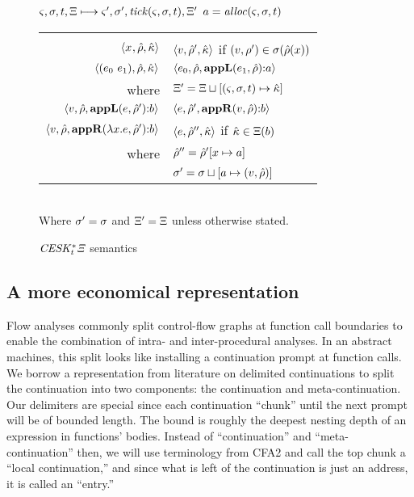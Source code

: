 \begin{figure}
  \centering
  $\varsigma,\sigma,t,\Xi \longmapsto \varsigma',\sigma',\mathit{tick}(\varsigma,\sigma,t),\Xi'$ \quad $a = \mathit{alloc}(\varsigma,\sigma,t)$ \\
  \begin{tabular}{r|l}
    \hline\vspace{-3mm}\\
    $\langle x^{{}}, \hat{\rho}, \hat{\kappa} \rangle$
    &
    $\langle v, \hat{\rho}',\hat{\kappa} \rangle$ if $(v,\rho') \in \sigma(\hat{\rho}(x))$
    \\
    $\langle (e_{0}\ e_{1}){},\hat{\rho},\hat{\kappa} \rangle$
    &
    $\langle e_{0},\hat{\rho},\mathbf{appL}(e_{1},\hat{\rho}){\tt :} a \rangle$ \\
    where & $\Xi' = \Xi\sqcup[(\varsigma,\sigma,t) \mapsto \hat{\kappa}]$
    \\
    $\langle v,\hat{\rho}, \mathbf{appL}(e,\hat{\rho}'){\tt :} b \rangle$
    &
    $\langle e,\hat{\rho}',\mathbf{appR}(v,\hat{\rho}){\tt :} b \rangle$
    \\
    $\langle v,\hat{\rho},\mathbf{appR}(\lambda{} x. e,\hat{\rho}'){\tt :} b \rangle$
    &
    $\langle e,\hat{\rho}'',\hat{\kappa} \rangle$ if $\hat{\kappa} \in \Xi(b)$ \\
    where & $\hat{\rho}'' = \hat{\rho}'[x\mapsto a]$ \\
          & $\sigma' = \sigma\sqcup[a \mapsto (v,\hat{\rho})]$
  \end{tabular} \\
  Where $\sigma' = \sigma$ and $\Xi' = \Xi$ unless otherwise stated.
  \caption{$\mathit{CESK^*_t\Xi}$ semantics}
  \label{fig:ceskkstart-semantics}
\end{figure}

\subsection{A more economical representation}

Flow analyses commonly split control-flow graphs at function call boundaries to enable the combination of intra- and inter-procedural analyses.
%
In an abstract machines, this split looks like installing a continuation prompt at function calls.
%
We borrow a representation from literature on delimited continuations to split the continuation into two components: the continuation and meta-continuation.
%
Our delimiters are special since each continuation ``chunk'' until the next prompt will be of bounded length.
%
The bound is roughly the deepest nesting depth of an expression in functions' bodies.
%
Instead of ``continuation'' and ``meta-continuation'' then, we will use terminology from CFA2 and call the top chunk a ``local continuation,'' and since what is left of the continuation is just an address, it is called an ``entry.''
%
%

